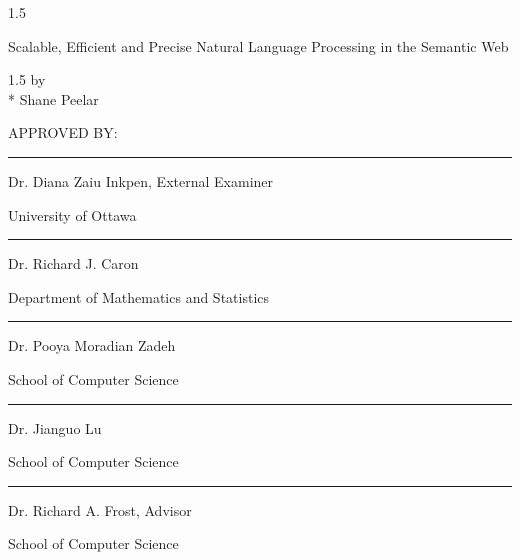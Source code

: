 \documentclass[fleqn, oneside, 12pt]{book}
\theoremstyle{definitionsty}
\newcommand{\uwinonehalfspacelen}{1.5}
\newenvironment{uwinonehalfspaceenv}%
{\begin{spacing}{\uwinonehalfspacelen}}%
	{\end{spacing}}
\newcommand{\dtitle}{Scalable, Efficient and Precise Natural Language Processing in the Semantic Web}
\begin{document}


\clearpage
\thispagestyle{empty}

\begin{center}
	\begin{uwinonehalfspaceenv}
		\parbox{6in}{\centering\dtitle}
	\end{uwinonehalfspaceenv}
	
	
	\vspace{0.35cm}
	\begin{uwinonehalfspaceenv}
		by \\*
	{Shane Peelar}
	\end{uwinonehalfspaceenv}
	
	
	
	\vspace{0.5in}
	
	APPROVED BY:
	
	\vspace{0.5in}
	
	\noindent\rule{4in}{0.4pt}

	Dr. Diana Zaiu Inkpen, External Examiner
	
	University of Ottawa
	
	\vspace{0.5in}
	
	\noindent\rule{4in}{0.4pt}
	
	Dr. Richard J. Caron
	
	Department of Mathematics and Statistics
	
	\vspace{0.5in}
	
	\noindent\rule{4in}{0.4pt}
	
	Dr. Pooya Moradian Zadeh
	
	School of Computer Science
	
	\vspace{0.5in}

	\noindent\rule{4in}{0.4pt}
	
	Dr. Jianguo Lu
	
	School of Computer Science
	
	\vspace{0.5in}
	
	\noindent\rule{4in}{0.4pt}
	
	Dr. Richard A. Frost, Advisor
	
	School of Computer Science
	
	\vspace{0.5in}
	
\end{center}
\end{document}
